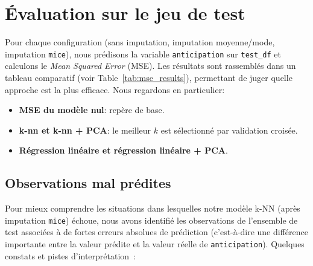 \documentclass[11pt]{article}
\begin{document}
	
	\section{Évaluation sur le jeu de test}
	Pour chaque configuration (sans imputation, imputation moyenne/mode, imputation \texttt{mice}), nous prédisons la variable \texttt{anticipation} sur \texttt{test\_df} et calculons le \emph{Mean Squared Error} (MSE). Les résultats sont rassemblés dans un tableau comparatif (voir Table~\ref{tab:mse_results}), permettant de juger quelle approche est la plus efficace. Nous regardons en particulier:
	
	\begin{itemize}
		\item \textbf{MSE du modèle nul}: repère de base.
		\item \textbf{k-nn et k-nn + PCA}: le meilleur $k$ est sélectionné par validation croisée.
		\item \textbf{Régression linéaire et régression linéaire + PCA}.
	\end{itemize}
	
\subsection{Observations mal prédites}

Pour mieux comprendre les situations dans lesquelles notre modèle k-NN (après imputation \texttt{mice}) échoue, nous avons identifié les observations de l’ensemble de test associées à de fortes erreurs absolues de prédiction (c’est-à-dire une différence importante entre la valeur prédite et la valeur réelle de \texttt{anticipation}). Quelques constats et pistes d’interprétation :
\end{document}

